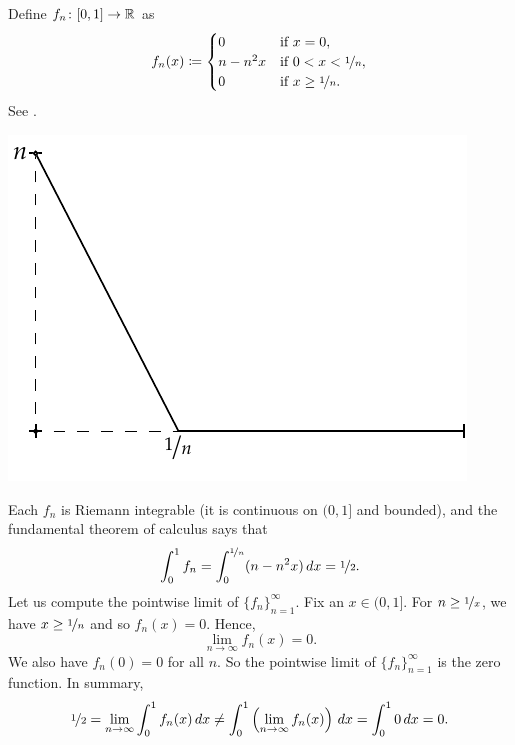 \begin{example}
Define $f_n \colon [0,1] \to {\mathbb{R}}$ as
\begin{equation*}
f_n(x) \coloneqq
\begin{cases}
0 &  \text{if } x = 0,\\
n-n^2x &  \text{if } 0 < x < \nicefrac{1}{n},\\
0 &  \text{if } x \geq \nicefrac{1}{n}.
\end{cases}
\avoidbreak
\end{equation*}
See .

\begin{myfigureht}
\includegraphics{figures/intconvcntr}
\caption{Graph of $f_n(x)$.%
\label{intconvcntr:fig}}
\end{myfigureht}

Each $f_n$ is Riemann integrable (it is continuous on $(0,1]$ and bounded),
and the fundamental theorem of calculus says that
\begin{equation*}
\int_0^1 f_n =
\int_0^{\nicefrac{1}{n}} (n-n^2x)\,dx = \nicefrac{1}{2} .
\end{equation*}
Let us compute the pointwise limit of $\{ f_n \}_{n=1}^\infty$.
Fix an $x \in (0,1]$.  For $n \geq \nicefrac{1}{x}$,
we have $x \geq \nicefrac{1}{n}$ and so $f_n(x) = 0$.  Hence,
\begin{equation*}
\lim_{n \to \infty} f_n(x) = 0.
\end{equation*}
We also have $f_n(0) = 0$ for all $n$.  So the pointwise
limit of $\{ f_n \}_{n=1}^\infty$ is the zero function.
In summary,
\begin{equation*}
\nicefrac{1}{2} =
\lim_{n\to\infty}
\int_0^1 f_n (x)\,dx
\not=
\int_0^1
\left(
\lim_{n\to\infty}
f_n(x)\right)\,dx
=
\int_0^1 0\,dx = 0 .
\end{equation*}
\end{example}

